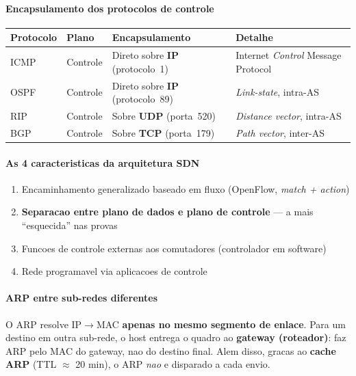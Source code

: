 \documentclass[11pt,a4paper]{article}
\begin{document}
\begin{explicacao}

\paragraph{Encapsulamento dos protocolos de controle}

\begin{center}
\begin{tabular}{llll}
\toprule
\textbf{Protocolo} & \textbf{Plano} & \textbf{Encapsulamento} & \textbf{Detalhe} \\
\midrule
ICMP  & Controle & Direto sobre \textbf{IP} (protocolo~1)  & Internet \textit{Control} Message Protocol \\
OSPF  & Controle & Direto sobre \textbf{IP} (protocolo~89) & \textit{Link-state}, intra-AS \\
RIP   & Controle & Sobre \textbf{UDP} (porta~520)           & \textit{Distance vector}, intra-AS \\
BGP   & Controle & Sobre \textbf{TCP} (porta~179)           & \textit{Path vector}, inter-AS \\
\bottomrule
\end{tabular}
\end{center}

\paragraph{As 4 caracteristicas da arquitetura SDN}
\begin{enumerate}[noitemsep, label=\arabic*.]
    \item Encaminhamento generalizado baseado em fluxo (OpenFlow, \textit{match + action})
    \item \textbf{Separacao entre plano de dados e plano de controle} --- a mais ``esquecida'' nas provas
    \item Funcoes de controle externas aos comutadores (controlador em software)
    \item Rede programavel via aplicacoes de controle
\end{enumerate}

\paragraph{ARP entre sub-redes diferentes}

O ARP resolve IP$\to$MAC \textbf{apenas no mesmo segmento de enlace}. Para um destino em outra sub-rede, o host entrega o quadro ao \textbf{gateway (roteador)}: faz ARP pelo MAC do gateway, nao do destino final. Alem disso, gracas ao \textbf{cache ARP} (TTL $\approx$ 20 min), o ARP \textit{nao} e disparado a cada envio.


\end{explicacao}
\end{document}
